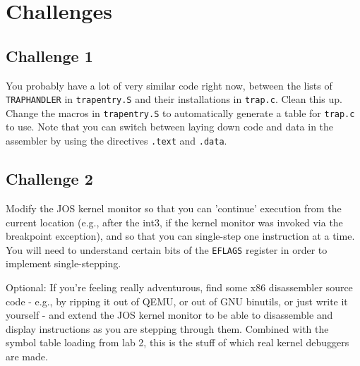 \documentclass[11pt]{article}
\begin{document}
\section{Challenges}
\subsection{Challenge 1}
\begin{framed}
You probably have a lot of very similar code right now, between the lists of \lstinline|TRAPHANDLER| in \lstinline|trapentry.S| and their installations in \lstinline|trap.c|. Clean this up. Change the macros in \lstinline|trapentry.S| to automatically generate a table for \lstinline|trap.c| to use. Note that you can switch between laying down code and data in the assembler by using the directives \lstinline|.text| and \lstinline|.data|. 
\end{framed}
\subsection{Challenge 2}
\begin{framed}
Modify the JOS kernel monitor so that you can 'continue' execution from the current location (e.g., after the int3, if the kernel monitor was invoked via the breakpoint exception), and so that you can single-step one instruction at a time. You will need to understand certain bits of the \lstinline|EFLAGS| register in order to implement single-stepping.

Optional: If you're feeling really adventurous, find some x86 disassembler source code - e.g., by ripping it out of QEMU, or out of GNU binutils, or just write it yourself - and extend the JOS kernel monitor to be able to disassemble and display instructions as you are stepping through them. Combined with the symbol table loading from lab 2, this is the stuff of which real kernel debuggers are made. 
\end{framed}
\end{document}
